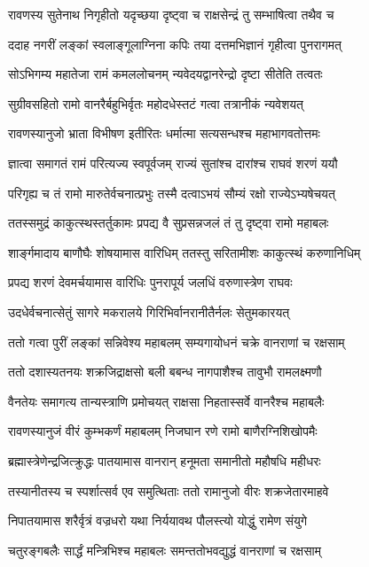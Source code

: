 \twolineshloka
{रावणस्य सुतेनाथ निगृहीतो यदृच्छया}
{दृष्ट्वा च राक्षसेन्द्रं तु सम्भाषित्वा तथैव च}%

\twolineshloka
{ददाह नगरीं लङ्कां स्वलाङ्गूलाग्निना कपिः}
{तया दत्तमभिज्ञानं गृहीत्वा पुनरागमत्}%

\twolineshloka
{सोऽभिगम्य महातेजा रामं कमललोचनम्}
{न्यवेदयद्वानरेन्द्रो दृष्टा सीतेति तत्वतः}%

\twolineshloka
{सुग्रीवसहितो रामो वानरैर्बहुभिर्वृतः}
{महोदधेस्तटं गत्वा तत्रानीकं न्यवेशयत्}%

\twolineshloka
{रावणस्यानुजो भ्राता विभीषण इतीरितः}
{धर्मात्मा सत्यसन्धश्च महाभागवतोत्तमः}%

\twolineshloka
{ज्ञात्वा समागतं रामं परित्यज्य स्वपूर्वजम्}
{राज्यं सुतांश्च दारांश्च राघवं शरणं ययौ}%

\twolineshloka
{परिगृह्य च तं रामो मारुतेर्वचनात्प्रभुः}
{तस्मै दत्वाऽभयं सौम्यं रक्षो राज्येऽभ्यषेचयत्}%

\twolineshloka
{ततस्समुद्रं काकुत्स्थस्तर्तुकामः प्रपद्य वै}
{सुप्रसन्नजलं तं तु दृष्ट्वा रामो महाबलः}%

\twolineshloka
{शार्ङ्गमादाय बाणौघैः शोषयामास वारिधिम्}
{ततस्तु सरितामीशः काकुत्स्थं करुणानिधिम्}%

\twolineshloka
{प्रपद्य शरणं देवमर्चयामास वारिधिः}
{पुनरापूर्य जलधिं वरुणास्त्रेण राघवः}%

\twolineshloka
{उदधेर्वचनात्सेतुं सागरे मकरालये}
{गिरिभिर्वानरानीतैर्नलः सेतुमकारयत्}%

\twolineshloka
{ततो गत्वा पुरीं लङ्कां सन्निवेश्य महाबलम्}
{सम्यगायोधनं चक्रे वानराणां च रक्षसाम्}%

\twolineshloka
{ततो दशास्यतनयः शक्रजिद्राक्षसो बली}
{बबन्ध नागपाशैश्च तावुभौ रामलक्ष्मणौ}%

\twolineshloka
{वैनतेयः समागत्य तान्यस्त्राणि प्रमोचयत्}
{राक्षसा निहतास्सर्वे वानरैश्च महाबलैः}%

\twolineshloka
{रावणस्यानुजं वीरं कुम्भकर्णं महाबलम्}
{निजघान रणे रामो बाणैरग्निशिखोपमैः}%

\twolineshloka
{ब्रह्मास्त्रेणेन्द्रजित्क्रुद्धः पातयामास वानरान्}
{हनूमता समानीतो महौषधि महीधरः}%

\twolineshloka
{तस्यानीतस्य च स्पर्शात्सर्व एव समुत्थिताः}
{ततो रामानुजो वीरः शक्रजेतारमाहवे}%

\twolineshloka
{निपातयामास शरैर्वृत्रं वज्रधरो यथा}
{निर्ययावथ पौलस्त्यो योद्धुं रामेण संयुगे}%

\twolineshloka
{चतुरङ्गबलैः सार्द्धं मन्त्रिभिश्च महाबलः}
{समन्ततोभवद्युद्धं वानराणां च रक्षसाम्}%

